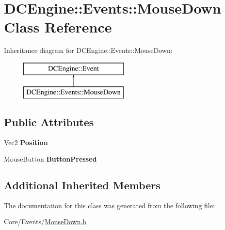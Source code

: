 \hypertarget{classDCEngine_1_1Events_1_1MouseDown}{\section{D\-C\-Engine\-:\-:Events\-:\-:Mouse\-Down Class Reference}
\label{classDCEngine_1_1Events_1_1MouseDown}
}
Inheritance diagram for D\-C\-Engine\-:\-:Events\-:\-:Mouse\-Down\-:\begin{figure}[H]
\begin{center}
\leavevmode
\includegraphics[height=2.000000cm]{classDCEngine_1_1Events_1_1MouseDown}
\end{center}
\end{figure}
\subsection*{Public Attributes}
\begin{DoxyCompactItemize}
\item 
\hypertarget{classDCEngine_1_1Events_1_1MouseDown_ac279d576c617154841aba7b6582d8f8c}{Vec2 {\bfseries Position}}\label{classDCEngine_1_1Events_1_1MouseDown_ac279d576c617154841aba7b6582d8f8c}

\item 
\hypertarget{classDCEngine_1_1Events_1_1MouseDown_a1c940271e34b8b607e24a0827936b7e6}{Mouse\-Button {\bfseries Button\-Pressed}}\label{classDCEngine_1_1Events_1_1MouseDown_a1c940271e34b8b607e24a0827936b7e6}

\end{DoxyCompactItemize}
\subsection*{Additional Inherited Members}


The documentation for this class was generated from the following file\-:\begin{DoxyCompactItemize}
\item 
Core/\-Events/\hyperlink{MouseDown_8h}{Mouse\-Down.\-h}\end{DoxyCompactItemize}
